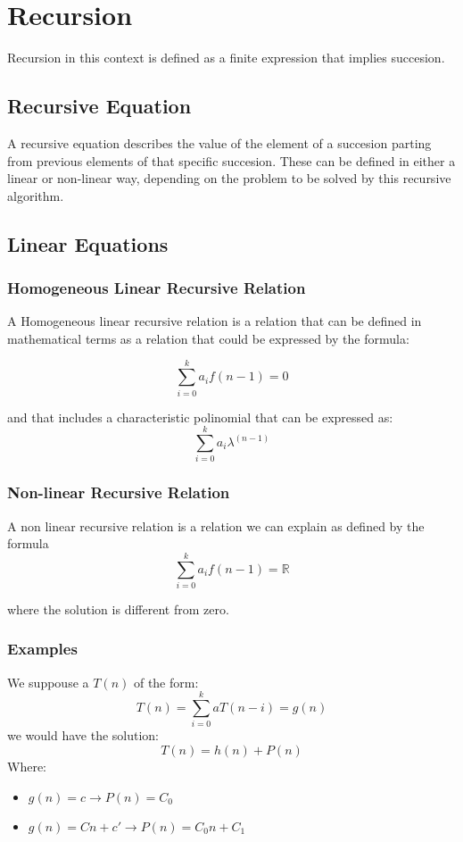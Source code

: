 \documentclass[12pt,a4paper,olive]{bbe}
\begin{document}
	\chapter{Recursion}
	Recursion in this context is defined as a finite expression that implies
	succesion.
	\section{Recursive Equation}
	A recursive equation describes the value of the element of a succesion 
	parting from previous elements of that specific succesion. These can be defined
	in either a linear or non-linear way, depending on the problem to be solved by
	this recursive algorithm.
	\section{Linear Equations}
	\subsection{Homogeneous Linear Recursive Relation}
	A Homogeneous linear recursive relation is a relation that can be defined
	in mathematical terms as a relation that could be expressed by the formula:

	$$ \sum_{i = 0}^{k} a_i f(n-1) = 0 $$

	and that includes a characteristic polinomial that can be expressed as:
	$$\sum_{i = 0}^{k} a_i \lambda^(n-1)$$

	\subsection{Non-linear Recursive Relation}
	A non linear recursive relation is a relation we can explain as defined by the formula
	$$ \sum_{i = 0}^{k} a_i f(n-1) = \mathbb{R} $$

	where the solution is different from zero.


	\subsection{Examples}

	We suppouse a $T(n)$ of the form:
	$$ T(n) = \sum_{i=0}^{k} aT(n-i)=g(n) $$
	we would have the solution:
	$$T(n) = h(n)+P(n)$$
	Where:

	\begin{itemize}
		\item $g(n)=c \rightarrow P(n)=C_0$
		\item $ g(n) = Cn + c' \rightarrow P(n) = C_0n+C_1 $
	\end{itemize}
\end{document}
